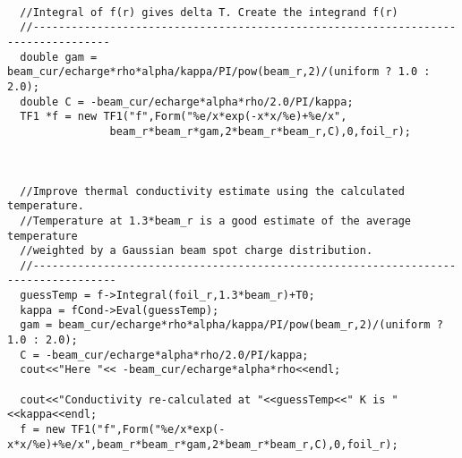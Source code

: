 \documentclass[12pt]{article}
\begin{document}
\begin{lstlisting}
  
  //Integral of f(r) gives delta T. Create the integrand f(r) 
  //----------------------------------------------------------------------------------
  double gam = beam_cur/echarge*rho*alpha/kappa/PI/pow(beam_r,2)/(uniform ? 1.0 : 2.0);
  double C = -beam_cur/echarge*alpha*rho/2.0/PI/kappa;
  TF1 *f = new TF1("f",Form("%e/x*exp(-x*x/%e)+%e/x",
			    beam_r*beam_r*gam,2*beam_r*beam_r,C),0,foil_r);


  
  //Improve thermal conductivity estimate using the calculated temperature.
  //Temperature at 1.3*beam_r is a good estimate of the average temperature
  //weighted by a Gaussian beam spot charge distribution.
  //-----------------------------------------------------------------------------------
  guessTemp = f->Integral(foil_r,1.3*beam_r)+T0;
  kappa = fCond->Eval(guessTemp);
  gam = beam_cur/echarge*rho*alpha/kappa/PI/pow(beam_r,2)/(uniform ? 1.0 : 2.0);
  C = -beam_cur/echarge*alpha*rho/2.0/PI/kappa;
  cout<<"Here "<< -beam_cur/echarge*alpha*rho<<endl;
  
  cout<<"Conductivity re-calculated at "<<guessTemp<<" K is "<<kappa<<endl;
  f = new TF1("f",Form("%e/x*exp(-x*x/%e)+%e/x",beam_r*beam_r*gam,2*beam_r*beam_r,C),0,foil_r);




\end{lstlisting}
\end{document}
